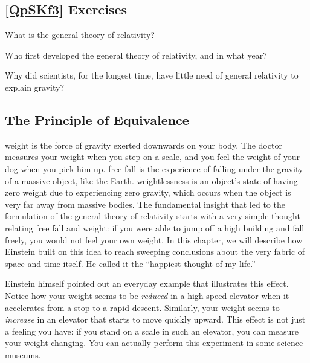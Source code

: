 \documentclass{article}
\numberwithin{equation}{section}
\numberwithin{figure}{section}
\begin{document}
\cyanhrule

\subsection*{\ref{QpSKf3} Exercises}

\begin{exercise} \label{iIb9Ml}
What is the general theory of relativity?
\end{exercise}

\begin{exercise}
    Who first developed the general theory of relativity, and in what year?
\end{exercise}

\begin{exercise}
    Why did scientists, for the longest time, have little need of general relativity to explain gravity?
\end{exercise}

\cyanhrule

\clearpage
\subsection*{The Principle of Equivalence} \label{FSL2KJ}

\Gls{weight} is the force of gravity exerted downwards on your body. The doctor measures your weight when you step on a scale, and you feel the weight of your dog when you pick him up. \Gls{free fall} is the experience of falling under the gravity of a massive object, like the Earth.  \Gls{weightlessness} is an object's state of having zero weight due to experiencing zero gravity, which occurs when the object is very far away from massive bodies. The fundamental insight that led to the formulation of the general theory of relativity starts with a very simple thought relating free fall and weight: if you were able to jump off a high building and fall freely, you would not feel your own weight. In this chapter, we will describe how Einstein built on this idea to reach sweeping conclusions about the very fabric of space and time itself. He called it the ``happiest thought of my life.''
\vspace{1em}

Einstein himself pointed out an everyday example that illustrates this effect. Notice how your weight seems to be \textit{reduced} in a high-speed elevator when it accelerates from a stop to a rapid descent. Similarly, your weight seems to \textit{increase} in an elevator that starts to move quickly upward. This effect is not just a feeling you have: if you stand on a scale in such an elevator, you can measure your weight changing. You can actually perform this experiment in some science museums.
\vspace{1em}
\end{document}
